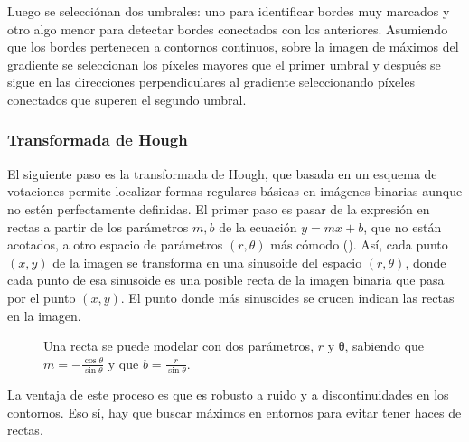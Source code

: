 \documentclass[nochap,palatino]{apuntes}
\begin{document}
Luego se selecciónan dos umbrales: uno para identificar bordes muy marcados y otro algo menor para detectar bordes conectados con los anteriores. Asumiendo que los bordes pertenecen a contornos continuos, sobre la imagen de máximos del gradiente se seleccionan los píxeles mayores que el primer umbral y después se sigue en las direcciones perpendiculares al gradiente seleccionando píxeles conectados que superen el segundo umbral.

\subsubsection{Transformada de Hough}

El siguiente paso es la transformada de Hough, que basada en un esquema de votaciones permite localizar formas regulares básicas en imágenes binarias aunque no estén perfectamente definidas. El primer paso es pasar de la expresión en rectas a partir de los parámetros $m,b$ de la ecuación $y = mx + b$, que no están acotados, a otro espacio de parámetros $(r,θ)$ más cómodo (). Así, cada punto $(x,y)$ de la imagen se transforma en una sinusoide del espacio $(r,θ)$, donde cada punto de esa sinusoide es una posible recta de la imagen binaria  que pasa por el punto $(x,y)$. El punto donde más sinusoides se crucen indican las rectas en la imagen.

\begin{figure}[hbtp]
\centering
{}
\caption{Una recta se puede modelar con dos parámetros, $r$ y θ, sabiendo que $m = -\frac{\cos θ}{\sin θ}$ y que $b = \frac{r}{\sin θ}$.}
\label{fig:RectasRTheta}
\end{figure}

La ventaja de este proceso es que es robusto a ruido y a discontinuidades en los contornos. Eso sí, hay que buscar máximos en entornos para evitar tener haces de rectas.
\end{document}
